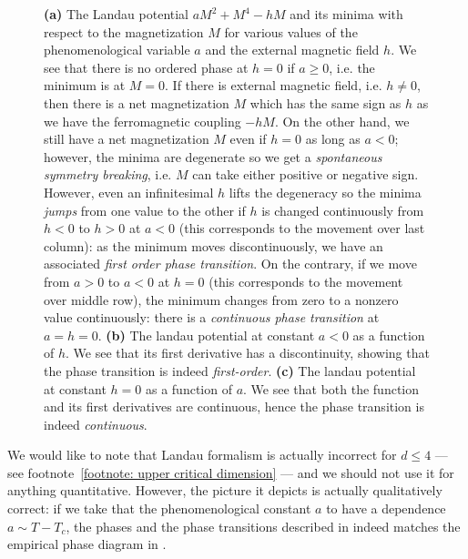\documentclass[12pt]{article}
\numberwithin{equation}{section}
\begin{document}
\begin{figure}
\begin{gather*}
\begin{aligned}
	\end{aligned}
\end{gather*}
	\caption[Phase transitions in the Landau formalism]{\label{fig: landau potential and phase transitions}\textbf{(a)} The Landau potential $a M^2+M^4-hM$ and its minima with respect to the magnetization $M$ for various values of the phenomenological variable $a$ and the external magnetic field $h$. We see that there is no ordered phase at $h=0$ if $a\ge 0$, i.e. the minimum is at $M=0$. If there is  external magnetic field, i.e. $h\ne 0$, then there is a net magnetization $M$ which has the same sign as $h$ as we have the ferromagnetic coupling $-h M$. On the other hand, we still have a net magnetization $M$ even if $h=0$ as long as $a<0$; however, the minima are degenerate so we get a \emph{spontaneous symmetry breaking}, i.e. $M$ can take either positive or negative sign. However, even an infinitesimal $h$ lifts the degeneracy so the minima \emph{jumps} from one value to the other if $h$ is changed continuously from $h<0$ to $h>0$ at $a<0$ (this corresponds to the movement over last column): as the minimum moves discontinuously, we have an associated \emph{first order phase transition}. On the contrary, if we move from $a>0$ to $a<0$ at $h=0$ (this corresponds to the movement over middle row), the minimum changes from zero to a nonzero value continuously: there is a \emph{continuous phase transition} at $a=h=0$. \textbf{(b)} The landau potential at constant $a<0$ as a function of $h$. We see that its first derivative has a discontinuity, showing that the phase transition is indeed \emph{first-order}. \textbf{(c)} The landau potential at constant $h=0$ as a function of $a$. We see that both the function and its first derivatives are continuous, hence the phase transition is indeed \emph{continuous}.
}
\end{figure}

We would like to note that Landau formalism is actually incorrect for $d\le 4$ --- see footnote~\ref{footnote: upper critical dimension} --- and we should not use it for anything quantitative. However, the picture it depicts is actually qualitatively correct: if we take that the phenomenological constant $a$ to have a dependence \mbox{$a\sim T-T_c$}, the phases and the phase transitions described in \figref{\ref{fig: landau potential and phase transitions}} indeed matches the empirical phase diagram in \figref{\ref{fig: phase diagram}}.
\end{document}
